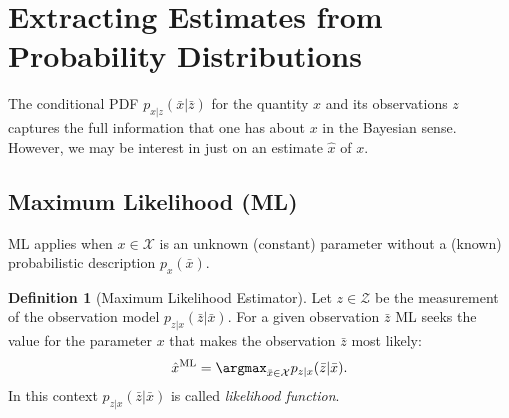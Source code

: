 \documentclass[margin=small]{hsrzf}
\theoremstyle{plain}
\theoremstyle{definition}
\newtheorem{defn}{Definition}[section]
\theoremstyle{remark}
\begin{document}

\section{Extracting Estimates from Probability Distributions}

The conditional PDF $p_{x|z}(\bar{x}|\bar{z})$ for the quantity $x$ and its
observations $z$ captures the full information that one has about $x$ in the
Bayesian sense. However, we may be interest in just on an estimate $\hat{x}$
of $x$.

\subsection{Maximum Likelihood (ML)}

ML applies when $x \in \mathcal{X}$ is an unknown (constant) parameter without
a (known) probabilistic description $p_x(\bar{x})$.

\begin{defn}[Maximum Likelihood Estimator]
  Let $z \in \mathcal{Z}$ be the measurement of the observation model
  $p_{z|x}(\bar{z} | \bar{x})$. For a given observation $\bar{z}$ ML seeks the
  value for the parameter $x$ that makes the observation $\bar{z}$ most
  likely:
  \[
    \hat{x}^\text{ML} = \argmax_{\bar{x} \in \mathcal{X}}
      p_{z|x} (\bar{z} | \bar{x}).
  \]
  In this context $p_{z|x} (\bar{z} | \bar{x})$ is called \emph{likelihood
  function}.
\end{defn}
\end{document}
